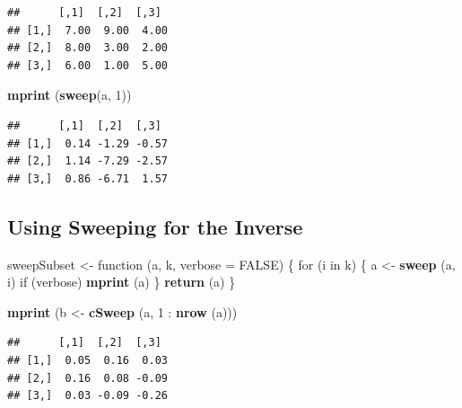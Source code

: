 \documentclass[]{article}
\newenvironment{Shaded}{\begin{snugshade}}{\end{snugshade}}
\newcommand{\KeywordTok}[1]{\textcolor[rgb]{0.13,0.29,0.53}{\textbf{{#1}}}}
\newcommand{\DataTypeTok}[1]{\textcolor[rgb]{0.13,0.29,0.53}{{#1}}}
\newcommand{\DecValTok}[1]{\textcolor[rgb]{0.00,0.00,0.81}{{#1}}}
\newcommand{\StringTok}[1]{\textcolor[rgb]{0.31,0.60,0.02}{{#1}}}
\newcommand{\OtherTok}[1]{\textcolor[rgb]{0.56,0.35,0.01}{{#1}}}
\newcommand{\NormalTok}[1]{{#1}}
\begin{document}
\begin{verbatim}
##      [,1]  [,2]  [,3] 
## [1,]  7.00  9.00  4.00
## [2,]  8.00  3.00  2.00
## [3,]  6.00  1.00  5.00
\end{verbatim}

\begin{Shaded}
\begin{Highlighting}[]
\KeywordTok{mprint} \NormalTok{(}\KeywordTok{sweep}\NormalTok{(a, }\DecValTok{1}\NormalTok{))}
\end{Highlighting}
\end{Shaded}

\begin{verbatim}
##      [,1]  [,2]  [,3] 
## [1,]  0.14 -1.29 -0.57
## [2,]  1.14 -7.29 -2.57
## [3,]  0.86 -6.71  1.57
\end{verbatim}

\subsection{Using Sweeping for the
Inverse}\label{using-sweeping-for-the-inverse}

\begin{Shaded}
\begin{Highlighting}[]
\NormalTok{sweepSubset <-}\StringTok{ }\NormalTok{function (a, k, }\DataTypeTok{verbose =} \OtherTok{FALSE}\NormalTok{) \{}
  \NormalTok{for (i in k) \{}
    \NormalTok{a <-}\StringTok{ }\KeywordTok{sweep} \NormalTok{(a, i)}
    \NormalTok{if (verbose) }\KeywordTok{mprint} \NormalTok{(a)}
  \NormalTok{\}}
  \KeywordTok{return} \NormalTok{(a)}
\NormalTok{\}}
\end{Highlighting}
\end{Shaded}

\begin{Shaded}
\begin{Highlighting}[]
\KeywordTok{mprint} \NormalTok{(b <-}\StringTok{ }\KeywordTok{cSweep} \NormalTok{(a, }\DecValTok{1} \NormalTok{:}\StringTok{ }\KeywordTok{nrow} \NormalTok{(a)))}
\end{Highlighting}
\end{Shaded}

\begin{verbatim}
##      [,1]  [,2]  [,3] 
## [1,]  0.05  0.16  0.03
## [2,]  0.16  0.08 -0.09
## [3,]  0.03 -0.09 -0.26
\end{verbatim}

\begin{Shaded}
\end{Shaded}
\end{document}
